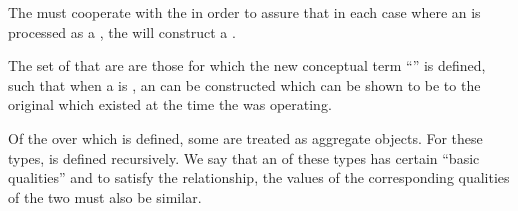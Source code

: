 The  must cooperate with the  in order to
assure that in each case where an  is processed
as a , the  will construct a 
.

The set of  that are  are those
for which the new conceptual term ``'' is defined, such that
when a  is , an  can be constructed
which can be shown to be  to the original  which
existed at the time the  was operating.

\endsubsubsection%



Of the  over which  is defined, 
some are treated as aggregate objects.  For these types, 
 is defined recursively.  
We say that an  of these types has certain ``basic qualities''
and to satisfy the  relationship, the values of the
corresponding qualities of the two  must also be similar.
 
\endsubsubsubsection%

% 
%  

